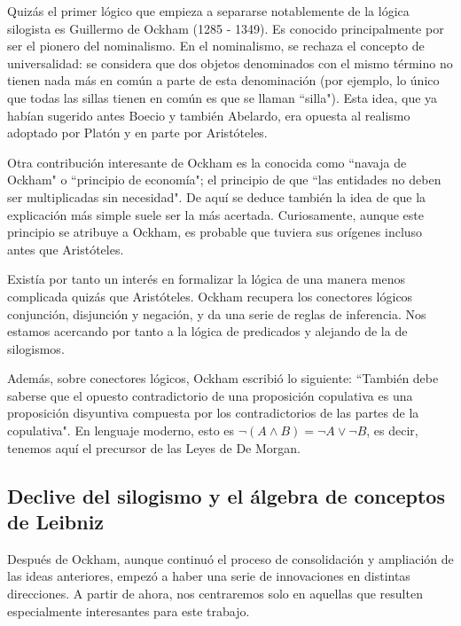 \documentclass{article}
\begin{document}
Quizás el primer lógico que empieza a separarse notablemente de la lógica silogista es Guillermo de Ockham (1285 - 1349). Es conocido principalmente por ser el pionero del nominalismo. En el nominalismo, se rechaza el concepto de universalidad: se considera que dos objetos denominados con el mismo término no tienen nada más en común a parte de esta denominación (por ejemplo, lo único que todas las sillas tienen en común es que se llaman ``silla"). Esta idea, que ya habían sugerido antes Boecio\cite{blackburn2005oxford} y también Abelardo, era opuesta al realismo adoptado por Platón y en parte por Aristóteles.

Otra contribución interesante de Ockham es la conocida como ``navaja de Ockham" o ``principio de economía"; el principio de que ``las entidades no deben ser multiplicadas sin necesidad"\cite{blackburn2005oxford}. De aquí se deduce también la idea de que la explicación más simple suele ser la más acertada. Curiosamente, aunque este principio se atribuye a Ockham, es probable que tuviera sus orígenes incluso antes que Aristóteles\cite{thorburn1918myth}.

Existía por tanto un interés en formalizar la lógica de una manera menos complicada quizás que Aristóteles. Ockham recupera los conectores lógicos conjunción, disjunción y negación, y da una serie de reglas de inferencia\cite{boehner1990philosophical}. Nos estamos acercando por tanto a la lógica de predicados y alejando de la de silogismos.

\newpage

Además, sobre conectores lógicos, Ockham escribió lo siguiente: ``También debe saberse que el opuesto contradictorio de una proposición copulativa es una proposición disyuntiva compuesta por los contradictorios de las partes de la copulativa"\cite{logicmuseum_ockham}. En lenguaje moderno, esto es $\lnot (A \land B) = \lnot A \lor \lnot B$, es decir, tenemos aquí el precursor de las Leyes de De Morgan.

\subsection{Declive del silogismo y el álgebra de conceptos de Leibniz}

Después de Ockham, aunque continuó el proceso de consolidación y ampliación de las ideas anteriores, empezó a haber una serie de innovaciones en distintas direcciones. A partir de ahora, nos centraremos solo en aquellas que resulten especialmente interesantes para este trabajo.
\end{document}
